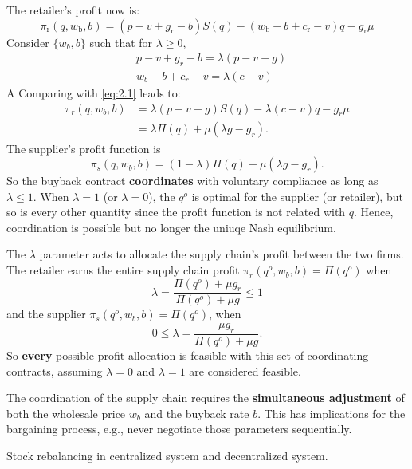 The retailer's profit now is:
$$\pi_{\mathrm{r}}\left(q, w_{\mathrm{b}}, b\right)=\left(p-v+g_{\mathrm{r}}-b\right) S(q)-\left(w_{\mathrm{b}}-b+c_{\mathrm{r}}-v\right) q-g_{\mathrm{r}} \mu$$
Consider $\{w_b,b\}$ such that for $\lambda\geq 0$,
\begin{align}
    &p-v+g_r-b=\lambda(p-v+g)\label{eq:2.5}\\
    &w_b-b+c_r-v=\lambda(c-v)\label{eq:2.6}
\end{align}
A Comparing with \autoref{eq:2.1} leads to:
\begin{align}
    \pi_r(q,w_b,b)&=\lambda(p-v+g)S(q)-\lambda(c-v)q-g_r\mu\nonumber\\
    &=\lambda\Pi(q)+\mu(\lambda g-g_r).\label{eq:2.7}
\end{align}
The supplier's profit function is 
\begin{equation*}
    \pi_s(q,w_b,b)=(1-\lambda)\Pi(q)-\mu(\lambda g-g_r).
\end{equation*}
So the buyback contract \textbf{coordinates} with voluntary compliance as long as $\lambda\leq 1$. When $\lambda=1$ (or $\lambda=0$), the $q^o$ is optimal for the supplier (or retailer), but so is every other quantity since the profit function is not related with $q$. Hence, coordination is possible but no longer the uniuqe Nash equilibrium.

The $\lambda$ parameter acts to allocate the supply chain's profit between the two firms. The retailer earns the entire supply chain profit $\pi_r(q^o,w_b,b)=\Pi(q^o)$ when 
\begin{equation}\label{eq:2.8}
    \lambda=\frac{\Pi(q^o)+\mu g_r}{\Pi(q^o)+\mu g}\leq 1
\end{equation}
and the supplier $\pi_s(q^o,w_b,b)=\Pi(q^o)$, when
\begin{equation}\label{eq:2.9}
    0\leq \lambda=\frac{\mu g_r}{\Pi(q^o)+\mu g}.
\end{equation}
So \textbf{every} possible profit allocation is feasible with this set of coordinating contracts, assuming $\lambda=0$ and $\lambda=1$ are considered feasible.

\begin{note}
    The coordination of the supply chain requires the \textbf{simultaneous adjustment} of both the wholesale price $w_b$ and the buyback rate $b$. This has implications for the bargaining process, e.g., never negotiate those parameters sequentially.
\end{note}

\begin{note}
    Stock rebalancing in centralized system and decentralized system.
\end{note}

